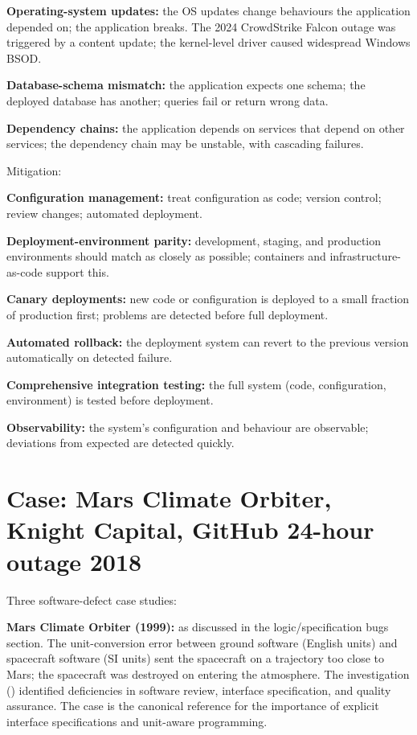 \textbf{Operating-system updates:} the OS updates change behaviours the application depended on; the application breaks. The 2024 CrowdStrike Falcon outage was triggered by a content update; the kernel-level driver caused widespread Windows BSOD.

\textbf{Database-schema mismatch:} the application expects one schema; the deployed database has another; queries fail or return wrong data.

\textbf{Dependency chains:} the application depends on services that depend on other services; the dependency chain may be unstable, with cascading failures.

Mitigation:

\textbf{Configuration management:} treat configuration as code; version control; review changes; automated deployment.

\textbf{Deployment-environment parity:} development, staging, and production environments should match as closely as possible; containers and infrastructure-as-code support this.

\textbf{Canary deployments:} new code or configuration is deployed to a small fraction of production first; problems are detected before full deployment.

\textbf{Automated rollback:} the deployment system can revert to the previous version automatically on detected failure.

\textbf{Comprehensive integration testing:} the full system (code, configuration, environment) is tested before deployment.

\textbf{Observability:} the system's configuration and behaviour are observable; deviations from expected are detected quickly.

\section{Case: Mars Climate Orbiter, Knight Capital, GitHub 24-hour outage 2018}

Three software-defect case studies:

\textbf{Mars Climate Orbiter (1999):} as discussed in the logic/specification bugs section. The unit-conversion error between ground software (English units) and spacecraft software (SI units) sent the spacecraft on a trajectory too close to Mars; the spacecraft was destroyed on entering the atmosphere. The investigation (\cite{acc:nasa-mco-mib}) identified deficiencies in software review, interface specification, and quality assurance. The case is the canonical reference for the importance of explicit interface specifications and unit-aware programming.

